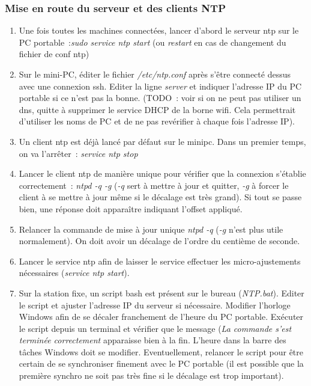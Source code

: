 \documentclass[a4paper, 10pt ]{article}
\begin{document}
\subsubsection{Mise en route du serveur et des clients NTP}
\begin{enumerate}
	\item Une fois toutes les machines connectées, lancer d'abord le serveur ntp sur le PC portable~:\emph{sudo service ntp start} (ou \emph{restart} en cas de changement du fichier de conf ntp)
	\item Sur le mini-PC, éditer le fichier \emph{/etc/ntp.conf} après s'être connecté dessus avec une connexion ssh. Editer la ligne \emph{server} et indiquer l'adresse IP du PC portable si ce n'est pas la bonne. (TODO~: voir si on ne peut pas utiliser un dns, quitte à supprimer le service DHCP de la borne wifi. Cela permettrait d'utiliser les noms de PC et de ne pas revérifier à chaque fois l'adresse IP).
	\item Un client ntp est déjà lancé par défaut sur le minipc. Dans un premier temps, on va l'arrêter~: \emph{service ntp stop}
	\item Lancer le client ntp de manière unique pour vérifier que la connexion s'établie correctement~: \emph{ntpd -q -g} (\emph{-q} sert à mettre à jour et quitter, \emph{-g} à forcer le client à se mettre à jour même si le décalage est très grand). Si tout se passe bien, une réponse doit apparaître indiquant l'offset appliqué.
	\item Relancer la commande de mise à jour unique \emph{ntpd -q} (\emph{-g} n'est plus utile normalement). On doit avoir un décalage de l'ordre du centième de seconde. 
	\item Lancer le service ntp afin de laisser le service effectuer les micro-ajustements nécessaires (\emph{service ntp start}). 
	\item Sur la station fixe, un script bash est présent sur le bureau (\emph{NTP.bat}). Editer le script et ajuster l'adresse IP du serveur si nécessaire. Modifier l'horloge Windows afin de se décaler franchement de l'heure du PC portable. Exécuter le script depuis un terminal et vérifier que le message (\emph{La commande s'est terminée correctement} apparaisse bien à la fin. L'heure dans la barre des tâches Windows doit se modifier. Eventuellement, relancer le script pour être certain de se synchroniser finement avec le PC portable (il est possible que la première synchro ne soit pas très fine si le décalage est trop important). 
\end{enumerate}
\end{document}
